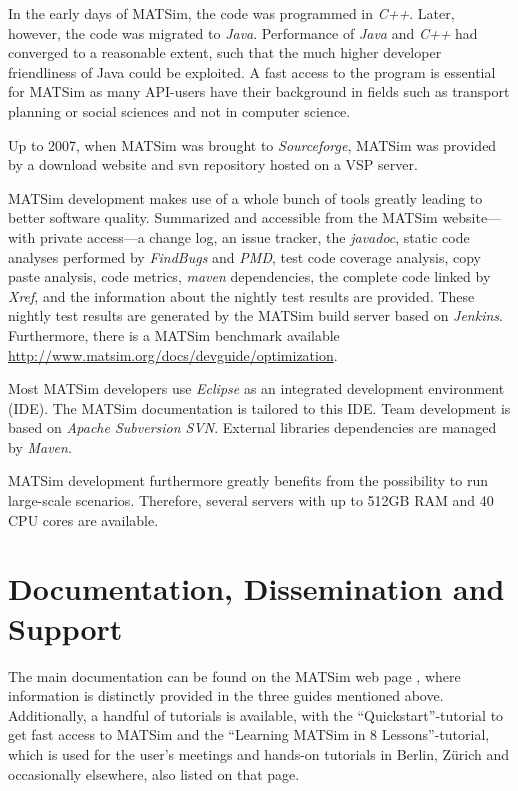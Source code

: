 In the early days of MATSim, the code was programmed in \emph{C++}. Later, however, the code was migrated to \emph{Java}. Performance of \emph{Java} and \emph{C++} had converged to a reasonable extent, such that the much higher developer friendliness of Java could be exploited. A fast access to the program is essential for MATSim as many API-users have their background in fields such as transport planning or social sciences and not in computer science. 

Up to 2007, when MATSim was brought to \emph{Sourceforge}, MATSim was provided by a download website and svn repository hosted on a VSP server.

MATSim development makes use of a whole bunch of tools greatly leading to better software quality. Summarized and accessible from the MATSim website---with private access---a change log, an issue tracker, the \emph{javadoc}, static code analyses performed by \emph{FindBugs} and \emph{PMD}, test code coverage analysis, copy paste analysis, code metrics, \emph{maven} dependencies, the complete code linked by \emph{Xref}, and the information about the nightly test results are provided. These nightly test results are generated by the MATSim build server based on \emph{Jenkins}. Furthermore, there is a MATSim benchmark available \url{http://www.matsim.org/docs/devguide/optimization}.

Most MATSim developers use \emph{Eclipse} as an integrated development environment (IDE). The MATSim documentation is tailored to this IDE. Team development is based on \emph{Apache Subversion SVN}. External libraries dependencies are managed by \emph{Maven}. 

MATSim development furthermore greatly benefits from the possibility to run large-scale scenarios. Therefore, several servers with up to 512GB RAM and 40 CPU cores are available.  

\section{Documentation, Dissemination and Support}
The main documentation can be found on the MATSim web page \citep[][]{MATSIM-T-Docu_Webpage_2014}, where information is distinctly provided in the three guides mentioned above. Additionally, a handful of tutorials is available, with the ``Quickstart''-tutorial to get fast access to MATSim and the ``Learning MATSim in 8 Lessons''-tutorial, which is used for the user's meetings and hands-on tutorials in Berlin, Zürich and occasionally elsewhere, also listed on that page. 


